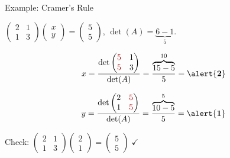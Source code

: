 \documentclass[10pt]{beamer}
\theoremstyle{definition}
\newcommand{\x}[1]{\alert{\textbf{#1}}}
\newcommand{\rd}[1]{{\color{red!70!black}#1}}
\begin{document}
\begin{frame}{Example: Cramer's Rule}

$\begin{pmatrix}2&1\\1&3\end{pmatrix}\begin{pmatrix}x\\y\end{pmatrix} = \begin{pmatrix}5\\5\end{pmatrix}$, \quad $\det(A) = \underbrace{6-1}_{5}$.

\vfill

$$x = \frac{\det\begin{pmatrix}\rd{5}&1\\\rd{5}&3\end{pmatrix}}{\det(A)}
= \frac{\overbrace{15-5}^{10}}{5} = \x{2}$$

\vfill

$$y = \frac{\det\begin{pmatrix}2&\rd{5}\\1&\rd{5}\end{pmatrix}}{\det(A)}
= \frac{\overbrace{10-5}^{5}}{5} = \x{1}$$

\vfill

Check: $\begin{pmatrix}2&1\\1&3\end{pmatrix}\begin{pmatrix}2\\1\end{pmatrix} = \begin{pmatrix}5\\5\end{pmatrix}\;\checkmark$

\end{frame}
\end{document}
